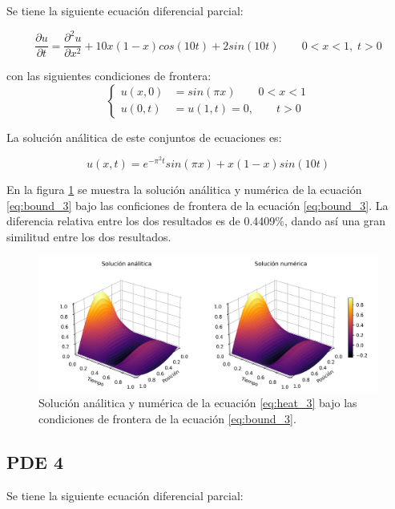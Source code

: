 Se tiene la siguiente ecuación diferencial parcial:

\begin{equation}
	\frac{\partial u}{\partial t} = \frac{\partial^2 u}{\partial x^2}+10x(1-x)cos(10t)+2sin(10t)\qquad 0<x<1, \; t>0 \label{eq:heat_3}
\end{equation}

con las siguientes condiciones de frontera:
\begin{equation}
	\begin{cases}
		u(x,0) & = sin(\pi x) \qquad 0<x<1 \\
		u(0,t) & =u(1,t) = 0, \qquad t>0
	\end{cases} \label{eq:bound_3}
\end{equation}

La solución análitica de este conjuntos de ecuaciones es:

\begin{equation}
	u(x,t)= e^{-\pi^2 t}sin(\pi x)+x(1-x)sin(10t) \label{eq:sol_3}
\end{equation}

En la figura \ref{fig:sol_3} se muestra la solución análitica y numérica de la ecuación \ref{eq:bound_3} bajo las conficiones de frontera de la ecuación \ref{eq:bound_3}. La diferencia relativa entre los dos resultados es de 0.4409\%, dando así una gran similitud entre los dos resultados.

\begin{figure}[H]
	\centering
	\includegraphics[width=17cm]{Graphics/surface_3.png}
	\caption{Solución análitica y numérica de la ecuación \ref{eq:heat_3} bajo las condiciones de frontera de la ecuación \ref{eq:bound_3}.}
	\label{fig:sol_3}
\end{figure}

\subsection{PDE 4}

Se tiene la siguiente ecuación diferencial parcial:

